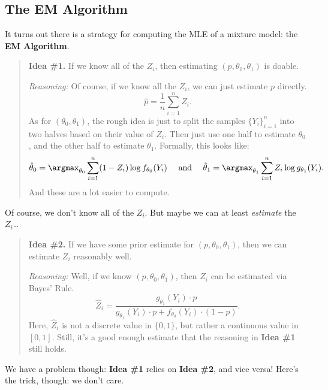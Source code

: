 \subsection{The EM Algorithm}

It turns out there is a strategy for computing the MLE of a mixture model:
the \textbf{EM Algorithm}.

\begin{quote}
    \textbf{Idea \#1.} If we know all of the $Z_i$,
    then estimating $(p, \theta_0, \theta_1)$ is doable.

    \emph{Reasoning:} Of course, if we know all the $Z_i$, we can just estimate $p$ directly.
    \[ \hat{p} = \frac{1}{n} \sum_{i = 1}^n Z_i. \]
    As for $(\theta_0, \theta_1)$,
    the rough idea is just to split the samples $\{Y_i\}_{i = 1}^n$
    into two halves based on their value of $Z_i$.
    Then just use one half to estimate $\theta_0$, and the other half to estimate $\theta_1$.
    Formally, this looks like:
    \[ \hat{\theta}_0 = \argmax_{\theta_0} \sum_{i = 1}^n (1 - Z_i) \log f_{\theta_0}(Y_i)
    ~~~ \text{ and } ~~~
    \hat{\theta}_1 = \argmax_{\theta_1} \sum_{i = 1}^n Z_i \log g_{\theta_1}(Y_i). \]
    And these are a lot easier to compute.
\end{quote}

Of course, we don't know all of the $Z_i$.
But maybe we can at least \emph{estimate} the $Z_i$\dots

\begin{quote}
    \textbf{Idea \#2.} If we have some prior estimate
    for $(p, \theta_0, \theta_1)$,
    then we can estimate $Z_i$ reasonably well.

    \emph{Reasoning:} Well, if we know $(p, \theta_0, \theta_1)$,
    then $Z_i$ can be estimated via Bayes' Rule.
    \[ \hat{Z}_i = \frac{g_{\theta_1}(Y_i) \cdot p}{
        g_{\theta_1}(Y_i) \cdot p + f_{\theta_0}(Y_i) \cdot (1 - p)
    }. \]
    Here, $\hat{Z}_i$ is not a discrete value in $\{0, 1\}$,
    but rather a continuous value in $[0, 1]$.
    Still, it's a good enough estimate that the reasoning in \textbf{Idea \#1} still holds.
\end{quote}

We have a problem though: \textbf{Idea \#1} relies on \textbf{Idea \#2},
and vice versa!  Here's the trick, though: we don't care.

